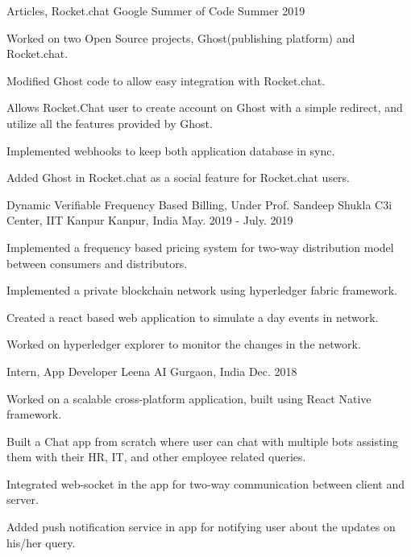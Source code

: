 \begin{cventries}

  \cventry
  {Articles, Rocket.chat}
  {Google Summer of Code}
  {}
  {Summer 2019}
  {
    \begin{cvitems}
      \item {Worked on two Open Source projects, Ghost(publishing platform) and Rocket.chat.}
      \item {Modified Ghost code to allow easy integration with Rocket.chat.}
      \item {Allows Rocket.Chat user to create account on Ghost with a simple redirect, and utilize all the features provided by Ghost.}
      \item {Implemented webhooks to keep both application database in sync.}
      \item {Added Ghost in Rocket.chat as a social feature for Rocket.chat users.}
    \end{cvitems}
  }
  
    \cventry
  {Dynamic Verifiable Frequency Based Billing, Under Prof. Sandeep Shukla}
  {C3i Center, IIT Kanpur}
  {Kanpur, India}
  {May. 2019 - July. 2019}
  {
    \begin{cvitems}
          \item {Implemented a frequency based pricing system for two-way distribution model between consumers and distributors.}
          \item {Implemented a private blockchain network using hyperledger fabric framework.}
          \item {Created a react based web application to simulate a day events in network.}
          \item {Worked on hyperledger explorer to monitor the changes in the network.}
    \end{cvitems}
  }
  
    \cventry
  {Intern, App Developer}
  {Leena AI}
  {Gurgaon, India}
  {Dec. 2018}
  {
    \begin{cvitems}
          \item {Worked on a scalable cross-platform application, built using React Native framework.}
          \item {Built a Chat app from scratch where user can chat with multiple bots assisting them with their HR, IT, and other employee related queries.}
          \item {Integrated web-socket in the app for two-way communication between client and server.}
          \item {Added push notification service in app for notifying user about the updates on his/her query.}
    \end{cvitems}
  }


\end{cventries}
